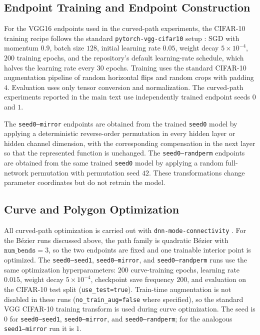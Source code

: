 \documentclass[11pt,a4paper]{report}
\begin{document}
\subsection{Endpoint Training and Endpoint Construction}

For the VGG16 endpoints used in the curved-path experiments, the CIFAR-10 training recipe follows the standard \texttt{pytorch-vgg-cifar10} setup \citep{fu_pytorch_vgg_cifar10}: SGD with momentum \(0.9\), batch size \(128\), initial learning rate \(0.05\), weight decay \(5\times 10^{-4}\), \(200\) training epochs, and the repository's default learning-rate schedule, which halves the learning rate every \(30\) epochs. Training uses the standard CIFAR-10 augmentation pipeline of random horizontal flips and random crops with padding \(4\). Evaluation uses only tensor conversion and normalization. The curved-path experiments reported in the main text use independently trained endpoint seeds \(0\) and \(1\).

The \texttt{seed0--mirror} endpoints are obtained from the trained \texttt{seed0} model by applying a deterministic reverse-order permutation in every hidden layer or hidden channel dimension, with the corresponding compensation in the next layer so that the represented function is unchanged. The \texttt{seed0--randperm} endpoints are obtained from the same trained \texttt{seed0} model by applying a random full-network permutation with permutation seed \(42\). These transformations change parameter coordinates but do not retrain the model.

\subsection{Curve and Polygon Optimization}

All curved-path optimization is carried out with \texttt{dnn-mode-connectivity} \citep{garipov_dnn_mode_connectivity}. For the Bézier runs discussed above, the path family is quadratic Bézier with \(\texttt{num\_bends}=3\), so the two endpoints are fixed and one trainable interior point is optimized. The \texttt{seed0--seed1}, \texttt{seed0--mirror}, and \texttt{seed0--randperm} runs use the same optimization hyperparameters: \(200\) curve-training epochs, learning rate \(0.015\), weight decay \(5\times 10^{-4}\), checkpoint save frequency \(200\), and evaluation on the CIFAR-10 test split (\texttt{use\_test=true}). Train-time augmentation is not disabled in these runs (\texttt{no\_train\_aug=false} where specified), so the standard VGG CIFAR-10 training transform is used during curve optimization. The seed is \(0\) for \texttt{seed0--seed1}, \texttt{seed0--mirror}, and \texttt{seed0--randperm}; for the analogous \texttt{seed1--mirror} run it is \(1\).
\end{document}
